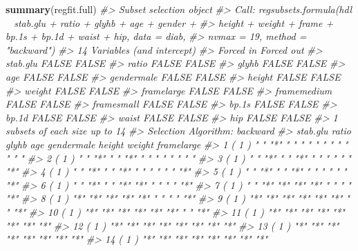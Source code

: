 \documentclass[]{book}
\newenvironment{Shaded}{\begin{snugshade}}{\end{snugshade}}
\newcommand{\KeywordTok}[1]{\textcolor[rgb]{0.13,0.29,0.53}{\textbf{#1}}}
\newcommand{\CommentTok}[1]{\textcolor[rgb]{0.56,0.35,0.01}{\textit{#1}}}
\newcommand{\NormalTok}[1]{#1}
\begin{document}
\begin{Shaded}
\begin{Highlighting}[]
\KeywordTok{summary}\NormalTok{(regfit.full)}
\CommentTok{#> Subset selection object}
\CommentTok{#> Call: regsubsets.formula(hdl ~ stab.glu + ratio + glyhb + age + gender + }
\CommentTok{#>     height + weight + frame + bp.1s + bp.1d + waist + hip, data = diab, }
\CommentTok{#>     nvmax = 19, method = "backward")}
\CommentTok{#> 14 Variables  (and intercept)}
\CommentTok{#>             Forced in Forced out}
\CommentTok{#> stab.glu        FALSE      FALSE}
\CommentTok{#> ratio           FALSE      FALSE}
\CommentTok{#> glyhb           FALSE      FALSE}
\CommentTok{#> age             FALSE      FALSE}
\CommentTok{#> gendermale      FALSE      FALSE}
\CommentTok{#> height          FALSE      FALSE}
\CommentTok{#> weight          FALSE      FALSE}
\CommentTok{#> framelarge      FALSE      FALSE}
\CommentTok{#> framemedium     FALSE      FALSE}
\CommentTok{#> framesmall      FALSE      FALSE}
\CommentTok{#> bp.1s           FALSE      FALSE}
\CommentTok{#> bp.1d           FALSE      FALSE}
\CommentTok{#> waist           FALSE      FALSE}
\CommentTok{#> hip             FALSE      FALSE}
\CommentTok{#> 1 subsets of each size up to 14}
\CommentTok{#> Selection Algorithm: backward}
\CommentTok{#>           stab.glu ratio glyhb age gendermale height weight framelarge}
\CommentTok{#> 1  ( 1 )  " "      "*"   " "   " " " "        " "    " "    " "       }
\CommentTok{#> 2  ( 1 )  " "      "*"   " "   "*" " "        " "    " "    " "       }
\CommentTok{#> 3  ( 1 )  " "      "*"   " "   "*" " "        " "    " "    "*"       }
\CommentTok{#> 4  ( 1 )  " "      "*"   " "   "*" " "        " "    " "    "*"       }
\CommentTok{#> 5  ( 1 )  " "      "*"   " "   "*" " "        " "    " "    "*"       }
\CommentTok{#> 6  ( 1 )  " "      "*"   " "   "*" "*"        " "    " "    "*"       }
\CommentTok{#> 7  ( 1 )  " "      "*"   "*"   "*" "*"        " "    " "    "*"       }
\CommentTok{#> 8  ( 1 )  "*"      "*"   "*"   "*" "*"        " "    " "    "*"       }
\CommentTok{#> 9  ( 1 )  "*"      "*"   "*"   "*" "*"        "*"    " "    "*"       }
\CommentTok{#> 10  ( 1 ) "*"      "*"   "*"   "*" "*"        "*"    " "    "*"       }
\CommentTok{#> 11  ( 1 ) "*"      "*"   "*"   "*" "*"        "*"    "*"    "*"       }
\CommentTok{#> 12  ( 1 ) "*"      "*"   "*"   "*" "*"        "*"    "*"    "*"       }
\CommentTok{#> 13  ( 1 ) "*"      "*"   "*"   "*" "*"        "*"    "*"    "*"       }
\CommentTok{#> 14  ( 1 ) "*"      "*"   "*"   "*" "*"        "*"    "*"    "*"       }

\end{Highlighting}
\end{Shaded}
\end{document}
